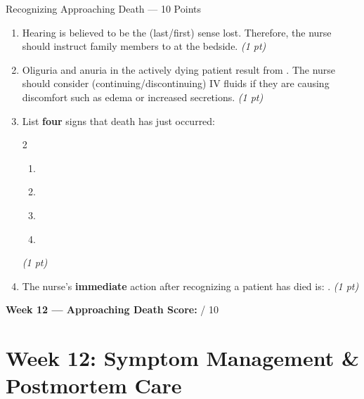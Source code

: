 \documentclass[11pt,letterpaper]{article}
\newcommand{\blank}[1][3cm]{\underline{\hspace{#1}}}
\begin{document}
\begin{diagbox}{Recognizing Approaching Death --- 10 Points}
\begin{enumerate}[leftmargin=1.5em, label=\textbf{\arabic*.},start=151]
  \item Hearing is believed to be the \blank[2cm] (last/first) sense lost.
        Therefore, the nurse should instruct family members to \blank[5cm]
        at the bedside.
        \hfill\textit{(1 pt)}

  \item Oliguria and anuria in the actively dying patient result from
        \blank[4cm].  The nurse should consider \blank[3cm]
        (continuing/discontinuing) IV fluids if they are causing discomfort such as
        edema or increased secretions.
        \hfill\textit{(1 pt)}

  \item List \textbf{four} signs that death has just occurred:
        \begin{multicols}{2}
        \begin{enumerate}[label=\arabic*.]
          \item \blank[4cm]
          \item \blank[4cm]
          \item \blank[4cm]
          \item \blank[4cm]
        \end{enumerate}
        \end{multicols}
        \hfill\textit{(1 pt)}

  \item The nurse's \textbf{immediate} action after recognizing a patient has died is:
        \blank[6cm].
        \hfill\textit{(1 pt)}

\end{enumerate}

\vspace{0.3cm}
\textbf{Week 12 --- Approaching Death Score:} \blank[1cm] / 10
\end{diagbox}

\newpage

\section{Week 12: Symptom Management \& Postmortem Care}
\end{document}
